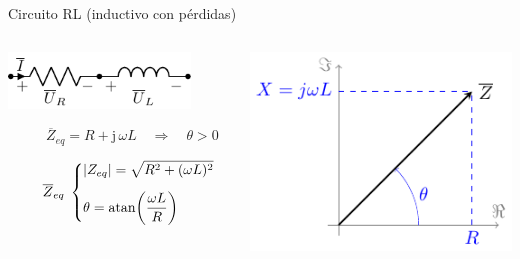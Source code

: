 \documentclass[aspectratio=169, usenames,svgnames,dvipsnames]{beamer}
\newcommand{\atan}{\mathrm{atan}}
\begin{document}
\begin{frame}{Circuito RL \hspace{3mm}(inductivo con pérdidas)}    
    \begin{columns}
    \begin{column}{0.45\columnwidth}
        \vspace{-3mm}
        \begin{center}
            \hspace*{12mm}\includegraphics[width=0.83\textwidth]{../figs/RL.pdf}
        \end{center}
        
        \[
            \qquad \overline{Z}_{eq} = R + \mathrm{j}\, \omega L \quad \Rightarrow \quad \boxed{\theta > 0}
        \]

        \[
            \quad\;\; \overline{Z}_{eq} \;
            \begin{dcases}
                |Z_{eq}| = \sqrt{R^2 + (\omega L)^2}\\[5pt]
                \theta = \atan{ \left( \frac{\omega L}{R} \right)}
            \end{dcases}
        \]
    \end{column}
    
    \begin{column}{0.55\columnwidth}
        \vspace{15mm}
        \begin{center}
            \includegraphics[width=.85\linewidth]{../figs/fasorInductanciaReal.pdf}
        \end{center}
    \end{column}
    \end{columns}
\end{frame}
\end{document}
